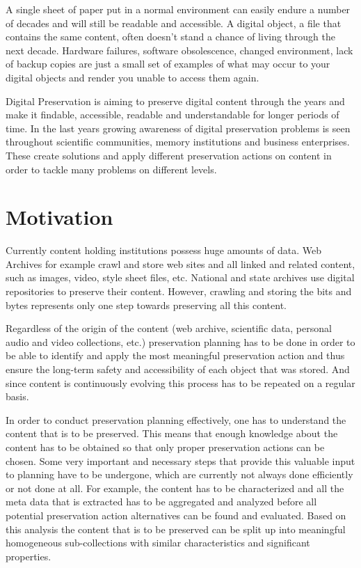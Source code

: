 A single sheet of paper put in a normal environment can easily endure a number of decades and will still be readable and accessible. A digital object, a file that contains the same content, often doesn't stand a chance of living through the next decade. Hardware failures, software obsolescence, changed environment, lack of backup copies are just a small set of examples of what may occur to your digital objects and render you unable to access them again.

Digital Preservation is aiming to preserve digital content through the years and make it findable, accessible, readable and understandable for longer periods of time. In the last years growing awareness of digital preservation problems is seen throughout scientific communities, memory institutions and business enterprises. These create solutions and apply different preservation actions on content in order to tackle many problems on different levels.

\section{Motivation}
Currently content holding institutions possess huge amounts of data. Web Archives for example crawl and store web sites and all linked and related content, such as images, video, style sheet files, etc. National and state archives use digital repositories to preserve their content. However, crawling and storing the bits and bytes represents only one step towards preserving all this content. 

Regardless of the origin of the content (web archive, scientific data, personal audio and video collections, etc.) preservation planning has to be done in order to be able to identify and apply the most meaningful preservation action and thus ensure the long-term safety and accessibility of each object that was stored. And since content is continuously evolving this process has to be repeated on a regular basis.

In order to conduct preservation planning effectively, one has to understand the content that is to be preserved. This means that enough knowledge about the content has to be obtained so that only proper preservation actions can be chosen.
Some very important and necessary steps that provide this valuable input to planning have to be undergone, which are currently not always done efficiently or not done at all.
For example, the content has to be characterized and all the meta data that is extracted has to be aggregated and analyzed before all potential preservation action alternatives can be found and evaluated. Based on this analysis the content that is to be preserved can be split up into meaningful homogeneous sub-collections with similar characteristics and significant properties.

